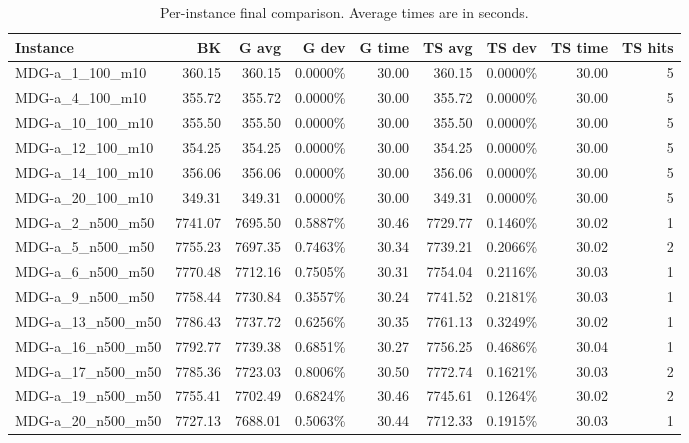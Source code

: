 \documentclass[12pt,a4paper]{article}
\begin{document}
\begin{table}[htbp]
\centering
\caption{Per-instance final comparison. Average times are in seconds.}
\tiny
\setlength{\tabcolsep}{2pt}
\begin{tabular}{@{}lrrrrrrrr@{}}
\toprule
Instance & BK & G avg & G dev & G time & TS avg & TS dev & TS time & TS hits \\
\midrule
MDG-a\_1\_100\_m10 & 360.15 & 360.15 & 0.0000\% & 30.00 & 360.15 & 0.0000\% & 30.00 & 5 \\
MDG-a\_4\_100\_m10 & 355.72 & 355.72 & 0.0000\% & 30.00 & 355.72 & 0.0000\% & 30.00 & 5 \\
MDG-a\_10\_100\_m10 & 355.50 & 355.50 & 0.0000\% & 30.00 & 355.50 & 0.0000\% & 30.00 & 5 \\
MDG-a\_12\_100\_m10 & 354.25 & 354.25 & 0.0000\% & 30.00 & 354.25 & 0.0000\% & 30.00 & 5 \\
MDG-a\_14\_100\_m10 & 356.06 & 356.06 & 0.0000\% & 30.00 & 356.06 & 0.0000\% & 30.00 & 5 \\
MDG-a\_20\_100\_m10 & 349.31 & 349.31 & 0.0000\% & 30.00 & 349.31 & 0.0000\% & 30.00 & 5 \\
MDG-a\_2\_n500\_m50 & 7741.07 & 7695.50 & 0.5887\% & 30.46 & 7729.77 & 0.1460\% & 30.02 & 1 \\
MDG-a\_5\_n500\_m50 & 7755.23 & 7697.35 & 0.7463\% & 30.34 & 7739.21 & 0.2066\% & 30.02 & 2 \\
MDG-a\_6\_n500\_m50 & 7770.48 & 7712.16 & 0.7505\% & 30.31 & 7754.04 & 0.2116\% & 30.03 & 1 \\
MDG-a\_9\_n500\_m50 & 7758.44 & 7730.84 & 0.3557\% & 30.24 & 7741.52 & 0.2181\% & 30.03 & 1 \\
MDG-a\_13\_n500\_m50 & 7786.43 & 7737.72 & 0.6256\% & 30.35 & 7761.13 & 0.3249\% & 30.02 & 1 \\
MDG-a\_16\_n500\_m50 & 7792.77 & 7739.38 & 0.6851\% & 30.27 & 7756.25 & 0.4686\% & 30.04 & 1 \\
MDG-a\_17\_n500\_m50 & 7785.36 & 7723.03 & 0.8006\% & 30.50 & 7772.74 & 0.1621\% & 30.03 & 2 \\
MDG-a\_19\_n500\_m50 & 7755.41 & 7702.49 & 0.6824\% & 30.46 & 7745.61 & 0.1264\% & 30.02 & 2 \\
MDG-a\_20\_n500\_m50 & 7727.13 & 7688.01 & 0.5063\% & 30.44 & 7712.33 & 0.1915\% & 30.03 & 1 \\
\bottomrule
\end{tabular}
\end{table}
\end{document}
